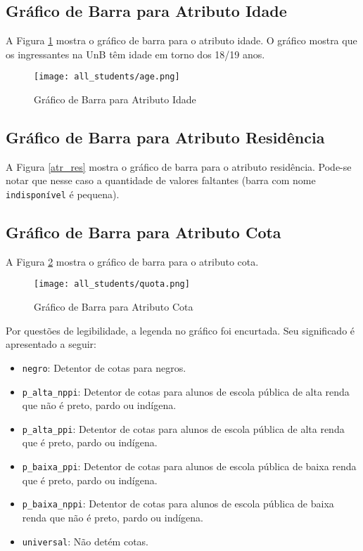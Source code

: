 \subsection{Gráfico de Barra para Atributo Idade}
A Figura \ref{atr_age} mostra o gráfico de barra para o atributo idade. O gráfico
mostra que os ingressantes na UnB têm idade em torno dos 18/19 anos. 
\begin{figure}[!ht]
    \caption{Gráfico de Barra para Atributo Idade}
    \centering
    \texttt{[image: all\_students/age.png]}
    \label{atr_age}
\end{figure}

\subsection{Gráfico de Barra para Atributo Residência}
A Figura \ref{atr_res} mostra o gráfico de barra para o atributo residência. Pode-se
notar que nesse caso a quantidade de valores faltantes (barra com nome
\texttt{indisponível} é pequena). 

\subsection{Gráfico de Barra para Atributo Cota}
A Figura \ref{atr_quota} mostra o gráfico de barra para o atributo cota. 
\begin{figure}[!ht]
    \caption{Gráfico de Barra para Atributo Cota}
    \centering
    \texttt{[image: all\_students/quota.png]}
    \label{atr_quota}
\end{figure}

Por questões de legibilidade, a legenda no gráfico foi encurtada. Seu significado é
apresentado a seguir: 
\begin{itemize}
    \item \texttt{negro}: Detentor de cotas para negros.
    \item \texttt{p\_alta\_nppi}: Detentor de cotas para alunos de escola pública de
        alta renda que não é preto, pardo ou indígena.
    \item \texttt{p\_alta\_ppi}: Detentor de cotas para alunos de escola pública de
        alta renda que é preto, pardo ou indígena.
    \item \texttt{p\_baixa\_ppi}: Detentor de cotas para alunos de escola pública de
        baixa renda que é preto, pardo ou indígena.
    \item \texttt{p\_baixa\_nppi}: Detentor de cotas para alunos de escola pública de
        baixa renda que não é preto, pardo ou indígena.
    \item \texttt{universal}: Não detém cotas.
\end{itemize}

